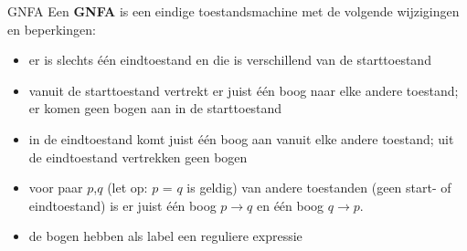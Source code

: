\begin{theo}[GNFA]{GNFA}
    Een \textbf{GNFA} is een eindige toestandsmachine met de volgende wijzigingen en beperkingen: \\

    \begin{minipage}{.56\textwidth}
        \begin{itemize}
            \item er is slechts één eindtoestand en die is verschillend van de starttoestand
            \item vanuit de starttoestand vertrekt er juist één boog naar elke andere toestand; er komen geen bogen aan in de starttoestand
            \item in de eindtoestand komt juist één boog aan vanuit elke andere toestand; uit de eindtoestand vertrekken geen bogen
            \item voor paar \(p\),\(q\) (let op: \(p\) = \(q\) is geldig) van andere toestanden (geen start- of eindtoestand) is er juist één boog \(p \longrightarrow q\) en één boog \(q \longrightarrow p\).
            \item  de bogen hebben als label een reguliere expressie
        \end{itemize} 
    \end{minipage}
    \hspace{0.1cm}
    \begin{minipage}{.4\textwidth}

\end{minipage}
\end{theo}
